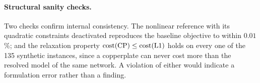 \paragraph{Structural sanity checks.}
Two checks confirm internal consistency. The nonlinear reference with its quadratic
constraints deactivated reproduces the baseline objective to within $0.01$\,\%; and the
relaxation property $\mathrm{cost}(\mathrm{CP}) \le \mathrm{cost}(\mathrm{L1})$ holds on every one of the
135 synthetic instances, since a copperplate can never cost more than the resolved model of
the same network. A violation of either would indicate a formulation error rather than a
finding.
